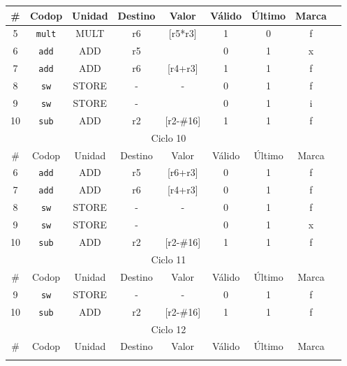 \begin{ejercicio}
\begin{table}[H]
\begin{tabular}{|c|c|c|c|c|c|c|c|c|}
            \hline
            \# & Codop      & Unidad & Destino & Valor & Válido & Último & Marca \\ \hline
            5  & \verb|mult|& MULT   & r6      & [r5*r3] & 1    & 0      & f     \\ \hline
            6  & \verb|add| & ADD    & r5      &       & 0      & 1      & x     \\ \hline
            7  & \verb|add| & ADD    & r6      & [r4+r3]  & 1   & 1      & f     \\ \hline
            8  & \verb|sw|  & STORE  & -       &  -    & 0      & 1      & f     \\ \hline
            9  & \verb|sw|  & STORE  & -       &       & 0      & 1      & i     \\ \hline
            10 & \verb|sub| & ADD    & r2      & [r2-\#16] & 1  & 1      & f     \\ \hline\hline
            \multicolumn{8}{|c|}{Ciclo 10} \\
            \hline
            \# & Codop      & Unidad & Destino & Valor & Válido & Último & Marca \\ \hline
            6  & \verb|add| & ADD    & r5      & [r6+r3] & 0    & 1      & f     \\ \hline
            7  & \verb|add| & ADD    & r6      & [r4+r3] & 0    & 1      & f     \\ \hline
            8  & \verb|sw|  & STORE  & -       & -     & 0      & 1      & f     \\ \hline
            9  & \verb|sw|  & STORE  & -       &       & 0      & 1      & x     \\ \hline
            10 & \verb|sub| & ADD    & r2      & [r2-\#16] & 1  & 1      & f     \\ \hline\hline
            \multicolumn{8}{|c|}{Ciclo 11} \\
            \hline
            \# & Codop      & Unidad & Destino & Valor & Válido & Último & Marca \\ \hline
            9  & \verb|sw|  & STORE  & -       & -     & 0      & 1      & f     \\ \hline
            10 & \verb|sub| & ADD    & r2      & [r2-\#16] & 1  & 1      & f     \\ \hline\hline
            \multicolumn{8}{|c|}{Ciclo 12} \\
            \hline
            \# & Codop      & Unidad & Destino & Valor & Válido & Último & Marca \\ \hline
            \multicolumn{8}{|c|}{} \\
            \hline
        \end{tabular}
    \end{table}
\end{ejercicio}

